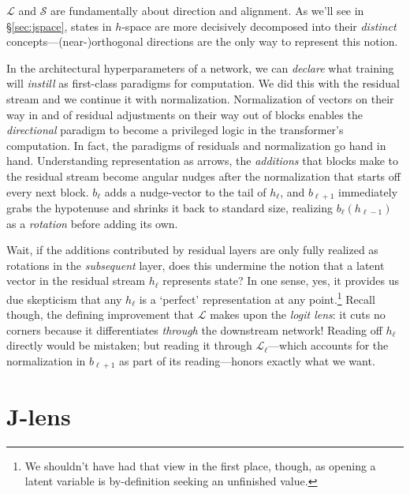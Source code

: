 \documentclass{article}
\newcommand{\jlens}{\mathscr{L}}
\newcommand{\jspace}{\mathscr{S}}
\begin{document}
\(\jlens\) and \(\jspace\) are fundamentally about direction and alignment. As we'll see in \S\ref{sec:jspace}, states in \(h\)-space are more decisively decomposed into their \textit{distinct} concepts---(near-)orthogonal directions are the only way to represent this notion. 

In the architectural hyperparameters of a network, we can \textit{declare} what training will \textit{instill} as first-class paradigms for computation. We did this with the residual stream and we continue it with normalization. Normalization of vectors on their way in and of residual adjustments on their way out of blocks enables the \textit{directional} paradigm to become a privileged logic in the transformer's computation. In fact, the paradigms of residuals and normalization go hand in hand. Understanding representation as arrows, the \textit{additions} that blocks make to the residual stream become angular nudges after the normalization that starts off every next block. \(b_\ell\) adds a nudge-vector to the tail of \(h_\ell\), and \(b_{\ell+1}\) immediately grabs the hypotenuse and shrinks it back to standard size, realizing \(b_\ell(h_{\ell-1})\) as a \textit{rotation} before adding its own.

Wait, if the additions contributed by residual layers are only fully realized as rotations in the \textit{subsequent} layer, does this undermine the notion that a latent vector in the residual stream \(h_\ell\) represents state? In one sense, yes, it provides us due skepticism that any \(h_\ell\) is a `perfect' representation at any point.\footnote{We shouldn't have had that view in the first place, though, as opening a latent variable is by-definition seeking an unfinished value.} Recall though, the defining improvement that \(\jlens\) makes upon the \textit{logit lens}: it cuts no corners because it differentiates \textit{through} the downstream network! Reading off \(h_\ell\) directly would be mistaken; but reading it through \(\jlens_\ell\)---which accounts for the normalization in \(b_{\ell+1}\) as part of its reading---honors exactly what we want.


\section{J-lens}
\end{document}

